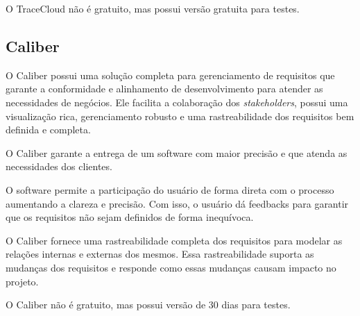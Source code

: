 O TraceCloud não é gratuito, mas possui versão gratuita para testes.

\subsection{Caliber}
O Caliber possui uma solução completa para gerenciamento de requisitos que garante a conformidade e alinhamento de desenvolvimento para atender as necessidades de negócios. Ele facilita a colaboração dos \textit{stakeholders}, possui uma visualização rica, gerenciamento robusto e uma rastreabilidade dos requisitos bem definida e completa.

O Caliber garante a entrega de um software com maior precisão e que atenda as necessidades dos clientes.

O software permite a participação do usuário de forma direta com o processo aumentando a clareza e precisão. Com isso, o usuário dá feedbacks para garantir que os requisitos não sejam definidos de forma inequívoca.

O Caliber fornece uma rastreabilidade completa dos requisitos para modelar as relações internas e externas dos mesmos.  Essa rastreabilidade suporta as mudanças dos requisitos  e responde como essas mudanças causam impacto no projeto.

O Caliber não é gratuito, mas possui versão de 30 dias para testes.
